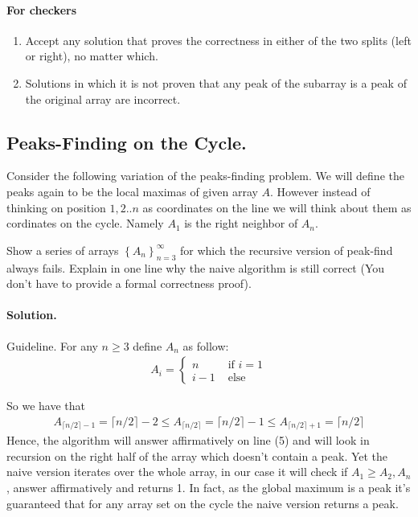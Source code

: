 \ifdefined\CHECK 
\paragraph{For checkers}

\begin{enumerate}
  \item Accept any solution that proves the correctness in either of the two splits (left or right), no matter which.
  \item Solutions in which it is not proven that any peak of the subarray is a peak of the original array are incorrect.
\end{enumerate}
\fi

\subsection{Peaks-Finding on the Cycle.} Consider the following variation of the peaks-finding problem. We will define the peaks again to be the local maximas of given array $A$. However instead of thinking on position ${1,2..n}$ as coordinates on the line we will think about them as cordinates on the cycle. Namely $A_{1}$ is the right neighbor of $A_{n}$. 


Show a series of arrays $\left\{ A_{n} \right\}_{n=3}^{\infty}$ for which the recursive version of peak-find always fails. Explain in one line why the naive algorithm is still correct (You don't have to provide a formal correctness proof).


\ifdefined\SOLUTION
  \paragraph{Solution.} Guideline. For any $n \ge 3$ define $A_{n}$ as follow:
\begin{equation*}
  \begin{split}
    A_{i} = \begin{cases}
      n & \text{ if } i = 1 \\
      i - 1 & \text{ else } 
    \end{cases}
  \end{split}
\end{equation*}

So we have that 
\begin{equation*}
  \begin{split}
    A_{\lceil n/2 \rceil - 1 } = \lceil n/2 \rceil - 2 \le A_{\lceil n/2 \rceil } = \lceil n/2 \rceil - 1 \le A_{\lceil n/2 \rceil + 1 } = \lceil n/2 \rceil  
  \end{split}
\end{equation*}
Hence, the algorithm will answer affirmatively on line (5) and will look in recursion on the right half of the array which doesn't contain a peak. Yet the naive version iterates over the whole array, in our case it will check if $A_{1} \ge A_{2},A_{n}$, answer affirmatively and returns 1. In fact, as the global maximum is a peak it's guaranteed that for any array set on the cycle the naive version returns a peak.



